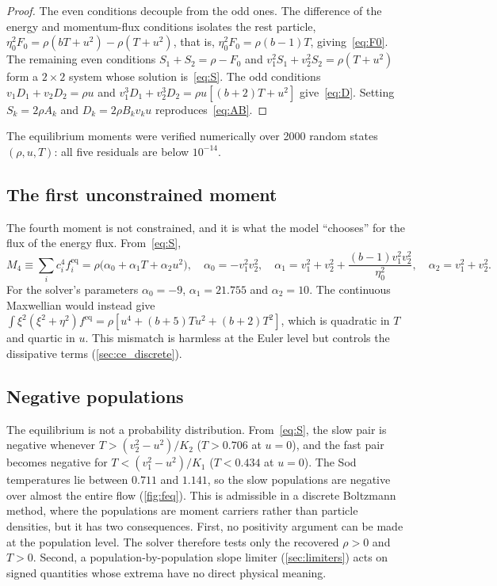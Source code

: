 \documentclass[11pt]{article}
\theoremstyle{remark}
\newcommand{\feq}{f^{\mathrm{eq}}}
\begin{document}
\begin{proof}
The even conditions decouple from the odd ones.  The difference of the energy and
momentum-flux conditions isolates the rest particle,
$\eta_0^2F_0 = \rho(bT+u^2) - \rho(T+u^2)$, that is, $\eta_0^2F_0 = \rho(b-1)T$, giving~\eqref{eq:F0}.
The remaining even conditions $S_1+S_2 = \rho - F_0$ and
$v_1^2S_1 + v_2^2S_2 = \rho(T+u^2)$ form a $2\times2$ system whose solution is~\eqref{eq:S}.
The odd conditions $v_1D_1 + v_2D_2 = \rho u$ and
$v_1^3D_1 + v_2^3D_2 = \rho u[(b+2)T+u^2]$ give~\eqref{eq:D}.  Setting
$S_k = 2\rho A_k$ and $D_k = 2\rho B_k v_k u$ reproduces~\eqref{eq:AB}.
\end{proof}

The equilibrium moments were verified numerically over 2000 random states
$(\rho,u,T)$: all five residuals are below $10^{-14}$.

\subsection{The first unconstrained moment}
\label{sec:M4}
The fourth moment is not constrained, and it is what the model ``chooses'' for the
flux of the energy flux.  From~\eqref{eq:S},
\begin{equation}
  M_4 \equiv \sum_i c_i^4 \feq_i = \rho\bigl(\alpha_0 + \alpha_1 T + \alpha_2 u^2\bigr),\quad
  \alpha_0 = -v_1^2v_2^2,\quad
  \alpha_1 = v_1^2+v_2^2 + \frac{(b-1)v_1^2v_2^2}{\eta_0^2},\quad
  \alpha_2 = v_1^2+v_2^2 .
  \label{eq:M4}
\end{equation}
For the solver's parameters $\alpha_0=-9$, $\alpha_1 = 21.755$ and $\alpha_2 = 10$.
The continuous Maxwellian would instead give
$\int\xi^2(\xi^2+\eta^2)\feq = \rho[u^4 + (b+5)Tu^2 + (b+2)T^2]$, which is quadratic in
$T$ and quartic in $u$.  This mismatch is harmless at the Euler level but controls
the dissipative terms (\cref{sec:ce_discrete}).

\subsection{Negative populations}
\label{sec:negative}
The equilibrium is not a probability distribution.  From~\eqref{eq:S},
the slow pair is negative whenever $T > (v_2^2-u^2)/K_2$ ($T>0.706$ at $u=0$), and
the fast pair becomes negative for $T < (v_1^2-u^2)/K_1$ ($T<0.434$ at $u=0$).
The Sod temperatures lie between $0.711$ and $1.141$, so the slow populations are
negative over almost the entire flow (\cref{fig:feq}).  This is admissible in a
discrete Boltzmann method, where the populations are moment carriers rather than
particle densities, but it has two consequences.  First, no positivity argument
can be made at the population level.  The solver therefore tests only the recovered
$\rho>0$ and $T>0$.  Second, a population-by-population slope limiter
(\cref{sec:limiters}) acts on signed quantities whose extrema have no direct
physical meaning.
\end{document}
